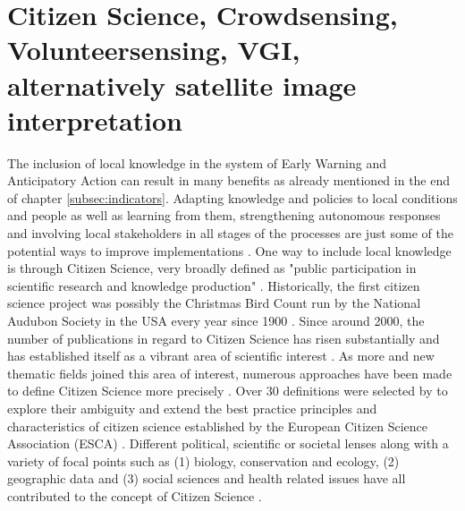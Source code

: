 {\section{Citizen Science, Crowdsensing, Volunteersensing, VGI,  alternatively satellite image interpretation}

The inclusion of local knowledge in the system of Early Warning and Anticipatory Action can result in many benefits as already mentioned in the end of chapter \ref*{subsec:indicators}. Adapting knowledge and policies to local conditions and people as well as learning from them, strengthening autonomous responses and involving local stakeholders in all stages of the processes are just some of the potential ways to improve implementations \autocite{giordanoIntegrationLocalScientific2013a,idmpDroughtWaterScarcity2022,lackstromBackyardHydroclimatologyCitizen2022,lealfilhoRoleIndigenousKnowledge2022,lealfilhoUnderstandingResponsesClimaterelated2022}. One way to include local knowledge is through Citizen Science, very broadly defined as "public participation in scientific research and knowledge production" \autocite{fraislCitizenScienceEnvironmental2022} .
Historically, the first citizen science project was possibly the Christmas Bird Count run by the National Audubon Society in the USA every year since 1900 \autocite{linkHierarchicalModelRegional2006,silvertownNewDawnCitizen2009}. Since around 2000, the number of publications in regard to Citizen Science has risen substantially and has established itself as a vibrant area of scientific interest \autocite{kirschkeCitizenScienceProjects2022}. As more and new thematic fields joined this area of interest, numerous approaches have been made to define Citizen Science more precisely \autocite{haklayWhatCitizenScience2021}. Over 30 definitions were selected by \autocite{haklayWhatCitizenScience2021} to explore their ambiguity and extend the best practice principles and characteristics of citizen science established by the European Citizen Science Association (ESCA) \autocite{escaTenPrinciplesCitizen2015,escaECSACharacteristicsCitizen2020}. Different political, scientific or societal lenses along with a variety of focal points such as (1) biology, conservation and ecology, (2) geographic data and (3) social sciences and health related issues have all contributed to the concept of Citizen Science \autocite{haklayWhatCitizenScience2021,kirschkeCitizenScienceProjects2022,kullenbergWhatCitizenScience2016}.
}
